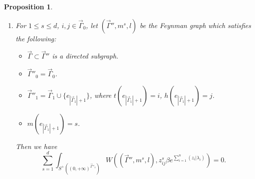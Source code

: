 \documentclass[11pt]{amsart}
\newtheorem{prop}[thm]{Proposition}
\theoremstyle{definition}
\theoremstyle{remark}
\numberwithin{equation}{section}
\begin{document}
\begin{prop}
\begin{enumerate}
\begin{align}
        \int_{S^{+}((0,+\infty)^{\vec{\Gamma}_{1}})}W((\vec{\Gamma},m,l),\beta e^{\sum\limits_{i=1}^{n}(z_{i}|\lambda_{i})}).
        \end{align}
        \item For $1\leq s\leq d$, $i,j\in \vec{\Gamma}_{0}$, let $(\vec{\Gamma}'',m^{s},l)$ be the Feynman graph which satisfies the following:
        \begin{itemize}
            \item $\vec{\Gamma}\subset\vec{\Gamma}''$ is a directed subgraph.
            \item $\vec{\Gamma}''_{0}=\vec{\Gamma}_{0}$.
            \item $\vec{\Gamma}''_{1}=\vec{\Gamma}_{1}\cup\{e_{|\vec{\Gamma}_{1}|+1}\}$, where $t(e_{|\vec{\Gamma}_{1}|+1})=i$, $h(e_{|\vec{\Gamma}_{1}|+1})=j$.
            \item $m(e_{|\vec{\Gamma}_{1}|+1})=s$.
        \end{itemize}
        Then we have
        $$
        \sum_{s=1}^{d}\int_{S^{+}((0,+\infty)^{\vec{\Gamma}''_{1}})}W((\vec{\Gamma}'',m^{s},l),z_{ij}^{s}\beta e^{\sum\limits_{i=1}^{n}(z_{i}|\lambda_{i})})=0.
        $$
    \end{enumerate}
\end{prop}
\end{document}
